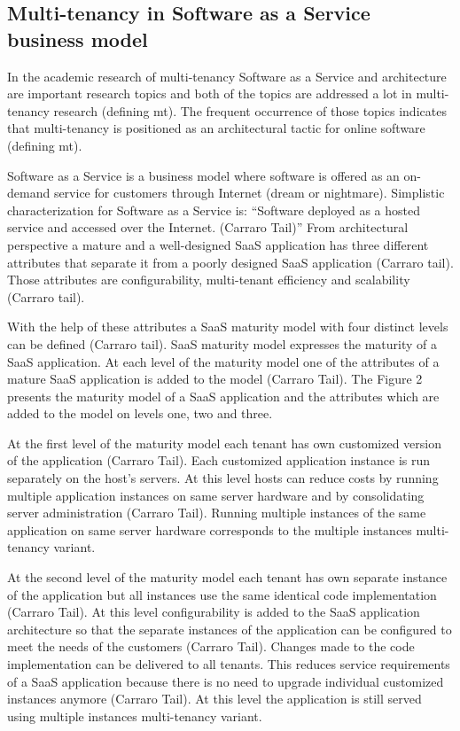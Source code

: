 \documentclass[conference]{sasmoota2017}
\begin{document}
\subsection{Multi-tenancy in Software as a Service business model}

In the academic research of multi-tenancy Software as a Service and architecture are important research topics and both of the topics are addressed a lot in multi-tenancy research (defining mt). The frequent occurrence of those topics indicates that multi-tenancy is positioned as an architectural tactic for online software (defining mt). 

Software as a Service is a business model where software is offered as an on-demand service for customers through Internet (dream or nightmare). Simplistic characterization for Software as a Service is: “Software deployed as a hosted service and accessed over the Internet. (Carraro Tail)” From architectural perspective a mature and a well-designed SaaS application has three different attributes that separate it from a poorly designed SaaS application (Carraro tail). Those attributes are configurability, multi-tenant efficiency and scalability (Carraro tail).

With the help of these attributes a SaaS maturity model with four distinct levels can be defined (Carraro tail). SaaS maturity model expresses the maturity of a SaaS application. At each level of the maturity model one of the attributes of a mature SaaS application is added to the model (Carraro Tail). The Figure 2 presents the maturity model of a SaaS application and the attributes which are added to the model on levels one, two and three. 

At the first level of the maturity model each tenant has own customized version of the application (Carraro Tail). Each customized application instance is run separately on the host’s servers. At this level hosts can reduce costs by running multiple application instances on same server hardware and by consolidating server administration (Carraro Tail). Running multiple instances of the same application on same server hardware corresponds to the multiple instances multi-tenancy variant. 

At the second level of the maturity model each tenant has own separate instance of the application but all instances use the same identical code implementation (Carraro Tail). At this level configurability is added to the SaaS application architecture so that the separate instances of the application can be configured to meet the needs of the customers (Carraro Tail). Changes made to the code implementation can be delivered to all tenants. This reduces service requirements of a SaaS application because there is no need to upgrade individual customized instances anymore (Carraro Tail). At this level the application is still served using multiple instances multi-tenancy variant.
\end{document}
